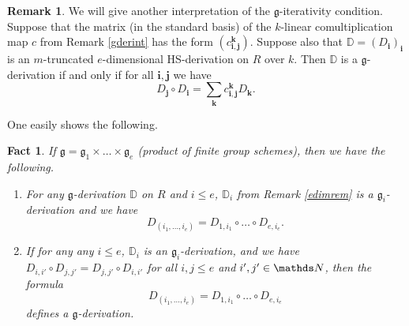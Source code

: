 \documentclass[10pt]{amsart}
\newtheorem{fact}[theorem]{Fact}
\theoremstyle{definition}
\newtheorem{remark}[theorem]{Remark}
\begin{document}
\begin{remark}\label{gderint2}
We will give another interpretation of the $\mathfrak{g}$-iterativity condition. Suppose that the matrix (in the standard basis) of the $k$-linear comultiplication map $c$ from Remark \ref{gderint} has the form $(c_{\mathbf{i},\mathbf{j}}^{\mathbf{k}})$. Suppose also that $\mathbb{D}=(D_{\mathbf{i}})_{\mathbf{i}}$ is an $m$-truncated $e$-dimensional HS-derivation on $R$ over $k$. Then $\mathbb{D}$ is a $\mathfrak{g}$-derivation if and only if for all $\mathbf{i},\mathbf{j}$ we have
$$D_{\mathbf{j}}\circ D_{\mathbf{i}}=\sum_{\mathbf{k}}c_{\mathbf{i},\mathbf{j}}^{\mathbf{k}}D_{\mathbf{k}}.$$
\end{remark}
\noindent
One easily shows the following.
\begin{fact}\label{frometo1}
If $\mathfrak{g}=\mathfrak{g}_1\times \ldots \times \mathfrak{g}_e$ (product of finite group schemes), then we have the following.
\begin{enumerate}
\item For any $\mathfrak{g}$-derivation $\mathbb{D}$ on $R$ and $i\leqslant e$, $\mathbb{D}_i$ from Remark \ref{edimrem} is a $\mathfrak{g}_i$-derivation and we have
$$D_{(i_1,\ldots,i_e)}=D_{1,i_1}\circ \ldots \circ D_{e,i_e}.$$
\item If for any any $i\leqslant e$, $\mathbb{D}_i$ is an $\mathfrak{g}_i$-derivation, and we have $D_{i,i'}\circ D_{j,j'}= D_{j,j'}\circ D_{i,i'}$ for all $i,j\leqslant e$ and $i',j'\in \Nn$, then the formula
$$D_{(i_1,\ldots,i_e)}=D_{1,i_1}\circ \ldots \circ D_{e,i_e}$$
defines a $\mathfrak{g}$-derivation.
\end{enumerate}
\end{fact}
\end{document}

